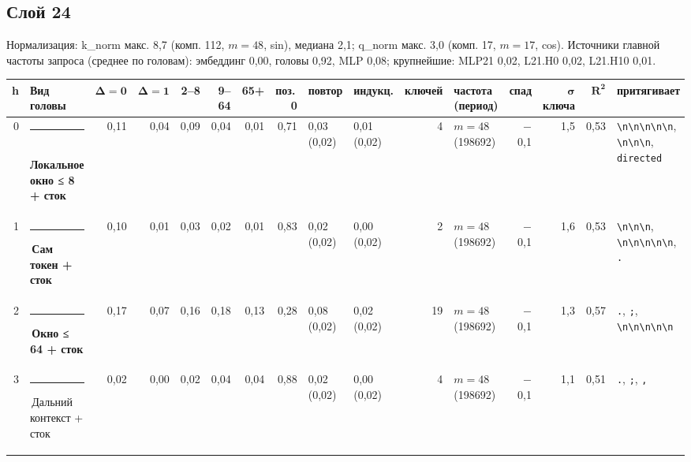 \documentclass[10pt]{article}
\begin{document}
\noindent\begin{minipage}{\linewidth}
\subsection*{Слой 24}
{\small\color{ink2} Нормализация: k\_norm макс. 8,7 (комп. 112, $m{=}48$, sin), медиана 2,1; q\_norm макс. 3,0 (комп. 17, $m{=}17$, cos). Источники главной частоты запроса (среднее по головам): эмбеддинг 0,00, головы 0,92, MLP 0,08; крупнейшие: MLP21 0,02, L21.H0 0,02, L21.H10 0,01.}
\begin{center}{\footnotesize\begin{tabular}{|r|l|r|r|r|r|r|r|l|l|r|l|r|r|r|l|}
\hline
\rowcolor{head}\textbf{h} & \textbf{Вид головы} & $\boldsymbol{\Delta{=}0}$ & $\boldsymbol{\Delta{=}1}$ & \textbf{2–8} & \textbf{9–64} & \textbf{65+} & \textbf{поз.\,0} & \textbf{повтор} & \textbf{индукц.} & \textbf{ключей} & \textbf{частота (период)} & \textbf{спад} & $\boldsymbol{\sigma}$ \textbf{ключа} & $\boldsymbol{R^2}$ & \textbf{притягивает} \\ \hline
0 & \textcolor[HTML]{1BAF7A}{\rule{0.62em}{0.62em}}\,\textbf{Локальное окно ≤ 8 + сток} & 0,11 & 0,04 & 0,09 & 0,04 & 0,01 & 0,71 & 0,03 (0,02) & 0,01 (0,02) & 4 & $m{=}48$ (198692) & $-$0,1 & 1,5 & 0,53 & \texttt{\textvisiblespace{}\textbackslash{}n\textbackslash{}n\textbackslash{}n\textbackslash{}n\textbackslash{}n}, \texttt{\textvisiblespace{}\textbackslash{}n\textbackslash{}n\textbackslash{}n}, \texttt{\textvisiblespace{}directed} \\ \hline
1 & \textcolor[HTML]{2A78D6}{\rule{0.62em}{0.62em}}\,\textbf{Сам токен + сток} & 0,10 & 0,01 & 0,03 & 0,02 & 0,01 & 0,83 & 0,02 (0,02) & 0,00 (0,02) & 2 & $m{=}48$ (198692) & $-$0,1 & 1,6 & 0,53 & \texttt{\textvisiblespace{}\textbackslash{}n\textbackslash{}n\textbackslash{}n}, \texttt{\textvisiblespace{}\textbackslash{}n\textbackslash{}n\textbackslash{}n\textbackslash{}n\textbackslash{}n}, \texttt{\textvisiblespace{}.} \\ \hline
2 & \textcolor[HTML]{EDA100}{\rule{0.62em}{0.62em}}\,\textbf{Окно ≤ 64 + сток} & 0,17 & 0,07 & 0,16 & 0,18 & 0,13 & 0,28 & 0,08 (0,02) & 0,02 (0,02) & 19 & $m{=}48$ (198692) & $-$0,1 & 1,3 & 0,57 & \texttt{\textvisiblespace{}.}, \texttt{\textvisiblespace{};}, \texttt{\textvisiblespace{}\textbackslash{}n\textbackslash{}n\textbackslash{}n\textbackslash{}n\textbackslash{}n} \\ \hline
3 & \textcolor[HTML]{C3C2B7}{\rule{0.62em}{0.62em}}\,Дальний контекст + сток & 0,02 & 0,00 & 0,02 & 0,04 & 0,04 & 0,88 & 0,02 (0,02) & 0,00 (0,02) & 4 & $m{=}48$ (198692) & $-$0,1 & 1,1 & 0,51 & \texttt{\textvisiblespace{}.}, \texttt{\textvisiblespace{};}, \texttt{\textvisiblespace{},} \\ \hline

\end{tabular}}
\end{center}
\end{minipage}
\end{document}
